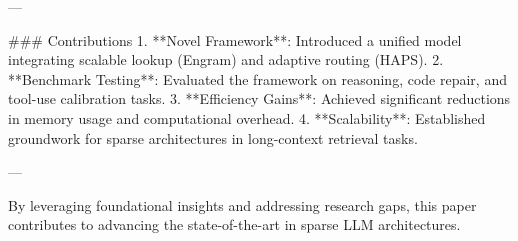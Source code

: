 ---

### Contributions  
1. **Novel Framework**: Introduced a unified model integrating scalable lookup (Engram) and adaptive routing (HAPS).  
2. **Benchmark Testing**: Evaluated the framework on reasoning, code repair, and tool-use calibration tasks.  
3. **Efficiency Gains**: Achieved significant reductions in memory usage and computational overhead.  
4. **Scalability**: Established groundwork for sparse architectures in long-context retrieval tasks.  

--- 

By leveraging foundational insights and addressing research gaps, this paper contributes to advancing the state-of-the-art in sparse LLM architectures.